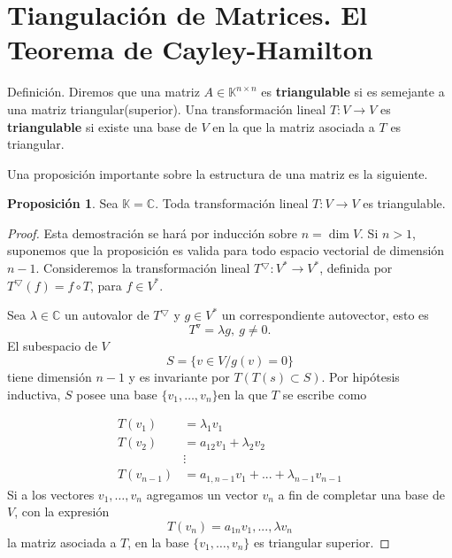 \documentclass[10pt,a4paper]{article}
\theoremstyle{definition}
\newtheorem{proposition}{Proposición}[section]
\begin{document}
\section{Tiangulación de Matrices. El Teorema de Cayley-Hamilton}
Definición. Diremos que una matriz $A\in \mathbb{K}^{n \times n}$ es \textbf{triangulable}  si es semejante a una matriz triangular(superior). Una transformación lineal $T\colon V\rightarrow V$ es \textbf{triangulable} si existe una base de $V$ en la que la matriz asociada a $T$ es triangular.

Una proposición importante sobre la estructura de una matriz es la siguiente.
\begin{proposition}
Sea $\mathbb{K}=\mathbb{C}$. Toda transformación lineal $T\colon V\rightarrow V$ es triangulable.
\end{proposition}

\begin{proof}
Esta demostración se hará por inducción sobre $n=\dim V$. Si $n>1$, suponemos que la proposición es valida para todo espacio vectorial de dimensión $n-1$. Consideremos la transformación lineal $T^{\bigtriangledown}\colon V^{*} \rightarrow V^{*}$, definida por $T^{\bigtriangledown}(f)=f\circ T$, para $f\in V^{*}$.

Sea $\lambda\in\mathbb{C}$ un autovalor de $T^{\bigtriangledown}$ y $g\in V^{*}$ un correspondiente autovector, esto es \[T^{\triangledown} = \lambda g ,~ g\neq 0.\] El subespacio de $V$ \[S = \{v \in V / g(v) = 0\}\] tiene dimensión $n-1$ y es invariante por $T(T(s)\subset S)$. Por hipótesis inductiva, $S$ posee una base $\{v_{1},\ldots,v_{n}\}$en la que $T$ se escribe como

\begin{align*}
		T(v_{1}) & = \lambda_{1}v_{1}\\
		T(v_{2}) & = a_{12}v_{1} + \lambda_{2}v_{2}\\
		& \vdots\\
		T(v_{n-1}) & = a_{1,n-1}v_{1} +...+ \lambda_{n-1}v_{n-1}
\end{align*}
Si a los vectores $v_{1},\ldots,v_{n}$ agregamos un vector $v_{n}$ a fin de completar una base de $V$, con la expresión \[T(v_{n}) = a_{1n}v_{1},...,\lambda v_{n} \]
la matriz asociada a $T$, en la base $\{v_{1},\ldots,v_{n}\}$ es triangular superior.
\end{proof}
\end{document}
